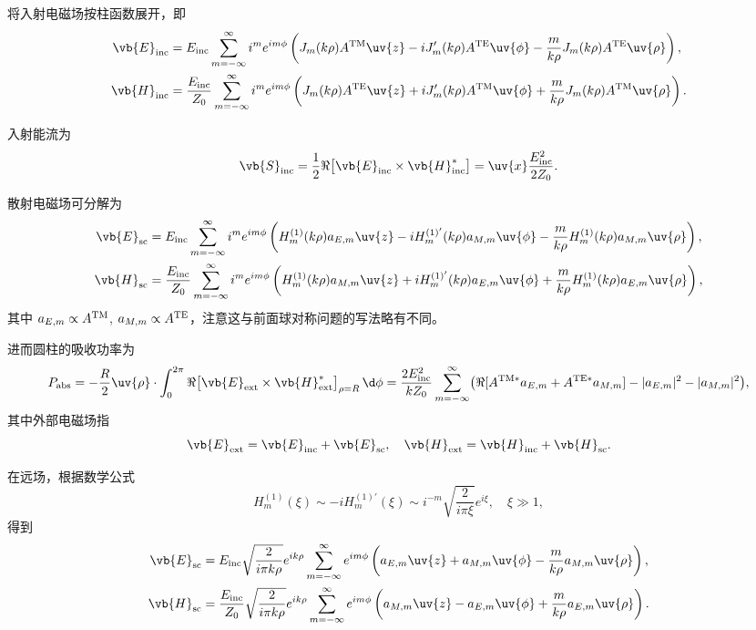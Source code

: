 将入射电磁场按柱函数展开，即
\begin{align*}
	\vb{E}_{\rm inc} & = E_{\rm inc} \sum_{m=-\infty}^{\infty} i^m e^{im\phi} \left( J_m(k\rho) A^{\rm TM} \uv{z} - i J_m'(k\rho) A^{\rm TE} \uv{\phi} - \frac{m}{k\rho} J_m(k\rho) A^{\rm TE} \uv{\rho} \right),             \\
	\vb{H}_{\rm inc} & = \frac{E_{\rm inc}}{Z_0} \sum_{m=-\infty}^{\infty} i^m e^{im\phi} \left( J_m(k\rho) A^{\rm TE} \uv{z} + i J_m'(k\rho) A^{\rm TM} \uv{\phi} + \frac{m}{k\rho} J_m(k\rho) A^{\rm TM} \uv{\rho} \right).
\end{align*}

入射能流为
\begin{equation*}
	\vb{S}_{\rm inc} = \frac12 \Re\bigl[ \vb{E}_{\rm inc} \times \vb{H}_{\rm inc}^* \bigr] = \uv{x} \frac{E_{\rm inc}^2}{2Z_0}.
\end{equation*}

散射电磁场可分解为
\begin{align*}
	\vb{E}_{\rm sc} & = E_{\rm inc} \sum_{m=-\infty}^{\infty} i^m e^{im\phi} \left( H_m^{(1)}(k\rho) a_{E,m} \uv{z} - i H_m^{(1)'}(k\rho) a_{M,m} \uv{\phi} - \frac{m}{k\rho} H_m^{(1)}(k\rho) a_{M,m} \uv{\rho} \right),             \\
	\vb{H}_{\rm sc} & = \frac{E_{\rm inc}}{Z_0} \sum_{m=-\infty}^{\infty} i^m e^{im\phi} \left( H_m^{(1)}(k\rho) a_{M,m} \uv{z} + i H_m^{(1)'}(k\rho) a_{E,m} \uv{\phi} + \frac{m}{k\rho} H_m^{(1)}(k\rho) a_{E,m} \uv{\rho} \right),
\end{align*}
其中 \(a_{E,m} \propto A^{\rm TM}\), \(a_{M,m} \propto A^{\rm TE}\)，注意这与前面球对称问题的写法略有不同。

进而圆柱的吸收功率为
\begin{equation*}
	P_{\rm abs} = -\frac{R}{2} \uv{\rho} \cdot \int_0^{2\pi} \Re\bigl[ \vb{E}_{\rm ext} \times \vb{H}_{\rm ext}^* \bigr]_{\rho=R} \,\d \phi = \frac{2E_{\rm inc}^2}{kZ_0} \sum_{m=-\infty}^{\infty} \bigl( \Re[A^{\rm TM*} a_{E,m} + A^{\rm TE*} a_{M,m}] - |a_{E,m}|^2 - |a_{M,m}|^2 \bigr),
\end{equation*}
其中外部电磁场指
\begin{equation*}
	\vb{E}_{\rm ext} = \vb{E}_{\rm inc} + \vb{E}_{\rm sc}, \quad \vb{H}_{\rm ext} = \vb{H}_{\rm inc} + \vb{H}_{\rm sc}.
\end{equation*}

在远场，根据数学公式
\begin{equation*}
	H_m^{(1)}(\xi) \sim -i H_m^{(1)'}(\xi) \sim i^{-m} \sqrt{\frac{2}{i\pi\xi}} e^{i\xi}, \quad \xi \gg 1,
\end{equation*}
得到
\begin{align*}
	\vb{E}_{\rm sc} & = E_{\rm inc} \sqrt{\frac{2}{i\pi k\rho}} e^{ik\rho} \sum_{m=-\infty}^{\infty} e^{im\phi} \left( a_{E,m} \uv{z} + a_{M,m} \uv{\phi} - \frac{m}{k\rho} a_{M,m} \uv{\rho} \right),             \\
	\vb{H}_{\rm sc} & = \frac{E_{\rm inc}}{Z_0} \sqrt{\frac{2}{i\pi k\rho}} e^{ik\rho} \sum_{m=-\infty}^{\infty} e^{im\phi} \left( a_{M,m} \uv{z} - a_{E,m} \uv{\phi} + \frac{m}{k\rho} a_{E,m} \uv{\rho} \right).
\end{align*}

